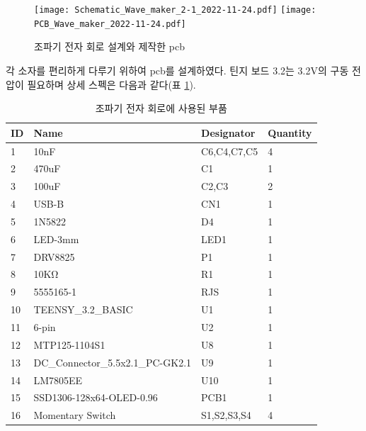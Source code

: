 \begin{figure}[H]
	\begin{center}
		\texttt{[image: Schematic\_Wave\_maker\_2-1\_2022-11-24.pdf]}
		\texttt{[image: PCB\_Wave\_maker\_2022-11-24.pdf]}
        \caption{조파기 전자 회로 설계와 제작한 pcb}
		\label{PCB}
	\end{center}
\end{figure}


각 소자를 편리하게 다루기 위하여 pcb를 설계하였다. 틴지 보드 3.2는 3.2$\mathrm{V}$의 구동 전압이 필요하며 상세 스펙은 다음과 같다(표 \ref{Specification of Teensy Board}).



\begin{table}[H]
    \centering
    \caption{조파기 전자 회로에 사용된 부품}
    \label{Specification of Teensy Board}
\begin{tabular}{l|llll}
\hline
ID & Name                             & \multicolumn{2}{l}{Designator}  & Quantity \\ \hline
1  & 10nF                             & \multicolumn{2}{l}{C6,C4,C7,C5} & 4        \\
2  & 470uF                            & \multicolumn{2}{l}{C1}          & 1        \\
3  & 100uF                            & \multicolumn{2}{l}{C2,C3}       & 2        \\
4  & USB-B                            & \multicolumn{2}{l}{CN1}         & 1        \\
5  & 1N5822                           & \multicolumn{2}{l}{D4}          & 1        \\
6  & LED-3mm                          & \multicolumn{2}{l}{LED1}        & 1        \\
7  & DRV8825                          & \multicolumn{2}{l}{P1}          & 1        \\
8  & 10KΩ                             & \multicolumn{2}{l}{R1}          & 1        \\
9  & 5555165-1                        & \multicolumn{2}{l}{RJS}         & 1        \\
10 & TEENSY\_3.2\_BASIC               & \multicolumn{2}{l}{U1}          & 1        \\
11 & 6-pin                            & \multicolumn{2}{l}{U2}          & 1        \\
12 & MTP125-1104S1                    & \multicolumn{2}{l}{U8}          & 1        \\
13 & DC\_Connector\_5.5x2.1\_PC-GK2.1 & \multicolumn{2}{l}{U9}          & 1        \\
14 & LM7805EE                         & \multicolumn{2}{l}{U10}         & 1        \\
15 & SSD1306-128x64-OLED-0.96         & \multicolumn{2}{l}{PCB1}        & 1        \\
16 & Momentary Switch                 & \multicolumn{2}{l}{S1,S2,S3,S4} & 4       
\\ \hline
\end{tabular}
\end{table}


